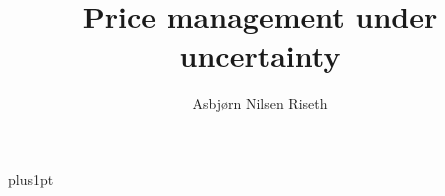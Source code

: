 \documentclass[12pt,fleqn]{infommthesis}
\title{Price management under uncertainty}
\author{Asbj{\o}rn Nilsen Riseth}
\def\biblio{}
\begin{document}
\def\biblio{} %

\baselineskip=18pt plus1pt

\setcounter{secnumdepth}{3}
\setcounter{tocdepth}{3}


\maketitle                  %
\begin{dedication}
\end{dedication}

\begin{acknowledgementslong}
\end{acknowledgementslong}

\begin{abstractseparate}
\end{abstractseparate}

\begin{originalitylong}
  
\end{originalitylong}

\begin{romanpages}          %
  \listoftodos[Notes]
  \tableofcontents            %
  \listoffigures              %
  \listoftables               %
\end{romanpages}            %












\appendix



\end{document}
